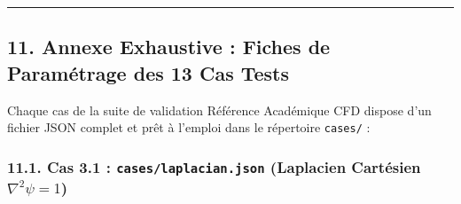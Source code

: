 \documentclass[
  french,
]{article}
\begin{document}
\begin{center}\rule{0.5\linewidth}{0.5pt}\end{center}

\subsection{11. Annexe Exhaustive : Fiches de Paramétrage des 13 Cas
Tests}\label{annexe-exhaustive-fiches-de-paramuxe9trage-des-13-cas-tests}

Chaque cas de la suite de validation Référence Académique CFD dispose
d'un fichier JSON complet et prêt à l'emploi dans le répertoire
\texttt{cases/} :

\subsubsection{\texorpdfstring{11.1. Cas 3.1 :
\texttt{cases/laplacian.json} (Laplacien Cartésien
\(\nabla^2 \psi = 1\))}{11.1. Cas 3.1 : cases/laplacian.json (Laplacien Cartésien \textbackslash nabla\^{}2 \textbackslash psi = 1)}}\label{cas-3.1-caseslaplacian.json-laplacien-cartuxe9sien-nabla2-psi-1}
\end{document}
